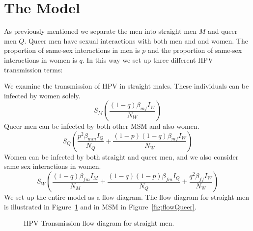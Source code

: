 \documentclass[12pt]{article}
\begin{document}
\section*{The Model}

As previously mentioned we separate the men into straight men $M$ and queer men $Q$.  Queer men have sexual interactions with both men and and women.  The proportion of same-sex interactions in men is $p$ and the proportion of same-sex interactions in women is $q$.  In this way we set up three different HPV transmission terms:

We examine the transmission of HPV in straight males.  These individuals can be infected by women solely.  
\begin{equation}
S_M\left(\frac{(1-q)\beta_{mf}I_W}{N_W}\right)
\end{equation}
Queer men can be infected by both other MSM and also women.
\begin{equation}
S_Q\left(\frac{p^2\beta_{mm}I_Q}{N_Q}+\frac{(1-p)(1-q)\beta_{mf}I_W}{N_W}\right)
\end{equation}
Women can be infected by both straight and queer men, and we also consider same sex interactions in women. 
\begin{equation}
S_W\left(\frac{(1-q)\beta_{fm}I_M}{N_M}+\frac{(1-q)(1-p)\beta_{fm}I_Q}{N_Q}+\frac{q^2\beta_{ff}I_W}{N_W}\right)
\end{equation}
We set up the entire model as a flow diagram.  The flow diagram for straight men is illustrated in Figure~\ref{fig:flowMen} and in MSM in Figure~\ref{fig:flowQueer}.  
\begin{figure}[h!]
\begin{center}
\end{center}
\caption{HPV Transmission flow diagram for straight men.}
\label{fig:flowMen}
\end{figure}
\end{document}
